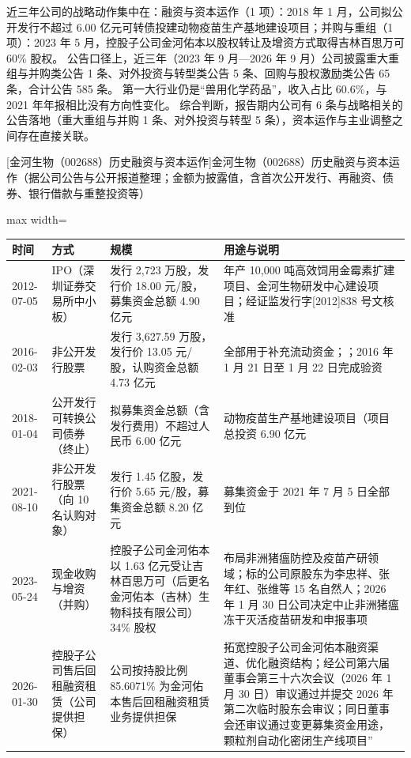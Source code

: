  近三年公司的战略动作集中在：融资与资本运作（1 项）：2018 年 1 月，公司拟公开发行不超过 6.00 亿元可转债投建动物疫苗生产基地建设项目；并购与重组（1 项）：2023 年 5 月，控股子公司金河佑本以股权转让及增资方式取得吉林百思万可 60\% 股权。 公告口径上，近三年（2023 年 9 月---2026 年 9 月）公司披露重大重组与并购类公告 1 条、对外投资与转型类公告 5 条、回购与股权激励类公告 65 条，合计公告 585 条。 第一大行业仍是“兽用化学药品”，收入占比 60.6\%，与 2021 年年报相比没有方向性变化。 综合判断，报告期内公司有 6 条与战略相关的公告落地（重大重组与并购 1 条、对外投资与转型 5 条），资本运作与主业调整之间存在直接关联。

\begin{center}\small\setlength{\tabcolsep}{4pt}
[金河生物（002688）历史融资与资本运作]{金河生物（002688）历史融资与资本运作（据公司公告与公开报道整理；金额为披露值，含首次公开发行、再融资、债券、银行借款与重整投资等）}
\begin{adjustbox}{max width=\textwidth}
\begin{tabular}{@{}p{1.45cm}p{2.55cm}p{4.05cm}p{4.95cm}@{}}
\toprule
时间 & 方式 & 规模 & 用途与说明 \\
\midrule
2012-07-05 & IPO（深圳证券交易所中小板） & 发行 2,\allowbreak{}723 万股，\allowbreak{}发行价 18.00 元/\allowbreak{}股，\allowbreak{}募集资金总额 4.90 亿元 & 年产 10,\allowbreak{}000 吨高效饲用金霉素扩建项目、\allowbreak{}金河生物研发中心建设项目；经证监发行字[2012]838 号文核准 \\
2016-02-03 & 非公开发行股票 & 发行 3,\allowbreak{}627.59 万股，\allowbreak{}发行价 13.05 元/\allowbreak{}股，\allowbreak{}认购资金总额 4.73 亿元 & 全部用于补充流动资金；；2016 年 1 月 21 日至 1 月 22 日完成验资 \\
2018-01-04 & 公开发行可转换公司债券（终止） & 拟募集资金总额（含发行费用）不超过人民币 6.00 亿元 & 动物疫苗生产基地建设项目（项目总投资 6.90 亿元 \\
2021-08-10 & 非公开发行股票（向 10 名认购对象） & 发行 1.45 亿股，\allowbreak{}发行价 5.65 元/\allowbreak{}股，\allowbreak{}募集资金总额 8.20 亿元 & 募集资金于 2021 年 7 月 5 日全部到位 \\
2023-05-24 & 现金收购与增资（并购） & 控股子公司金河佑本以 1.63 亿元受让吉林百思万可（后更名金河佑本（吉林）生物科技有限公司）34\% 股权 & 布局非洲猪瘟防控及疫苗产研领域；标的公司原股东为李忠祥、\allowbreak{}张年红、\allowbreak{}张维等 15 名自然人；2026 年 1 月 30 日公司决定中止非洲猪瘟冻干灭活疫苗研发和申报事项 \\
2026-01-30 & 控股子公司售后回租融资租赁（公司提供担保） & 公司按持股比例 85.6071\% 为金河佑本售后回租融资租赁业务提供担保 & 拓宽控股子公司金河佑本融资渠道、\allowbreak{}优化融资结构；经公司第六届董事会第三十六次会议（2026 年 1 月 30 日）审议通过并提交 2026 年第二次临时股东会审议；同日董事会还审议通过变更募集资金用途，\allowbreak{}颗粒剂自动化密闭生产线项目” \\

\end{tabular}
\end{adjustbox}
\end{center}
